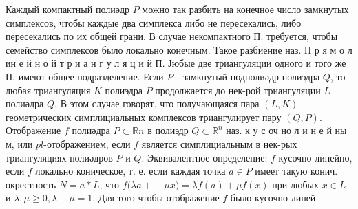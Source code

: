 \documentclass[10pt]{article}
\begin{document}
Каждый компактный полиәдр $P$ можно так разбить на конечное число замкнутых симплексов, чтобы каждые два симплекса либо не пересекались, либо пересекались по их общей грани. В случае некомпактного П. требуется, чтобы семейство симплексов было локально конечным. Такое разбиение наз. П р я м о л ин е й н о й т р и а н г у л я ц и й П. Јюбые две триангуляции одного и того же П. имеют общее подразделение. Если $P$ - замкнутый подполиәдр полиэдра $Q$, то любая триангуляция $K$ полиэдра $P$ продолжается до нек-рой триангуляции $L$ полиәдра $Q$. В этом случае говорят, что получающаяся пара $(L, K)$ геометрических симплициальных комплексов триангулирует пару $(Q, P)$. Отображение $f$ полиәдра $P \subset \mathbb{R} n$ в полиэдр $Q \subset \mathbb{R}^{n}$ наз. к у с оч но л и н е й ны м, или $p l$-отображением, если $f$ является симплициальным в нек-рых триангуляциях полиәдров $P$ и $Q$. Эквивалентное определение: $f$ кусочно линейно, если $f$ локально коническое, т. е. если каждая точка $a \in P$ имеет такую конич. окрестность $N=a * L$, что $f(\lambda a+$ $+\mu x)=\lambda f(a)+\mu f(x)$ при любых $x \in L$ и $\lambda, \mu \geqslant 0, \lambda+\mu=1$. Для того чтобы отображение $f$ было кусочно линей-
\end{document}
